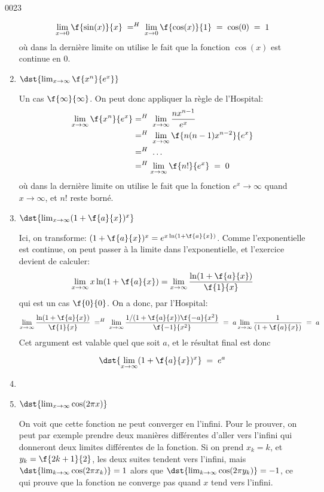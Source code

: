 \begin{corrige}{0023}
\begin{alternative}
\begin{enumerate}
		 \[\lim_{x\rightarrow 0}\f{\sin(x)}{x} \; =^{H}\; \lim_{x\rightarrow 0}\f{\cos(x)}{1}\;=\; \cos(0)\;=\;1\] o\`{u} dans la dernière limite on utilise le fait que la fonction $\cos(x)$ est continue en $0$.
		 
		 
		 \item $ \dst{\lim_{x\rightarrow \infty }\f{x^n}{e^x}}$\hs
		 
		Un cas $\f{\infty}{\infty}$. On peut donc appliquer la règle de l'Hospital:
	\begin{equation}
	\begin{aligned}[]
		\lim_{x\rightarrow \infty}\f{x^n}{e^x}&=^H\;  \lim_{x\rightarrow \infty}\frac{nx^{n-1}}{e^x}\\
			&=^H\;  \lim_{x\rightarrow \infty}\f{n(n-1)x^{n-2}}{e^x}\\
			&=^H\; \ldots\\
			&=^H\lim_{x\rightarrow \infty}\f{n!}{e^x}\;=\;0
	\end{aligned}
\end{equation}	 
		 où dans la dernière limite on utilise le fait que la fonction $e^x \rightarrow  \infty$ quand $x\rightarrow  \infty$, et $n!$ reste borné.
		 
		\item $\dst{ \lim_{x\rightarrow  \infty}(1+\f{a}{x})^x}$ \hs
		 
		Ici, on transforme: $ (1+\f{a}{x})^x = e^{x\ln(1+\f{a}{x})}$. Comme l'exponentielle est continue, on peut passer à la limite dans l'exponentielle, et l'exercice devient de calculer:
		 \[\lim_{x\rightarrow  \infty}x\ln(1+\f{a}{x}) = \lim_{x\rightarrow  \infty}\dfrac{\ln(1+\f{a}{x})}{\f{1}{x}}\]
		qui est un cas $\f{0}{0}$. On a donc, par l'Hospital:
		  \[\lim_{x\rightarrow  \infty}\dfrac{\ln(1+\f{a}{x})}{\f{1}{x}} \; =^H\;   \lim_{x\rightarrow  \infty}\dfrac{1/(1+\f{a}{x})\f{-a}{x^2}}{\f{-1}{x^2}} \; = \;      a\lim_{x\rightarrow  \infty}\dfrac{1}{(1+\f{a}{x})}   \;=\; a       \]
		Cet argument est valable quel que soit $a$, et le résultat final est donc  
		 
		 \[\dst{ \lim_{x\rightarrow  \infty}(1+\f{a}{x})^x} \;= \; e^a\] 
		 
		\item

		 \item $\dst{\lim_{x\rightarrow \infty} \cos(2\pi x)}$\hs
		 
		 On voit que cette fonction ne peut converger en l'infini. Pour le prouver, on peut par exemple prendre deux manières différentes d'aller vers l'infini qui donneront deux limites différentes de la fonction. 
		Si on prend $x_k=k$, et $y_k = \f{2k+1}{2}$, les deux suites tendent vers l'infini, mais  
		 $\dst{\lim_{k\rightarrow \infty} \cos(2\pi x_k)} = 1$ alors que $\dst{\lim_{k\rightarrow \infty} \cos(2\pi y_k)} =  -1$, ce qui prouve que la fonction ne converge pas quand $x$ tend vers l'infini.
		 

\end{enumerate}
\end{alternative}
\end{corrige}
